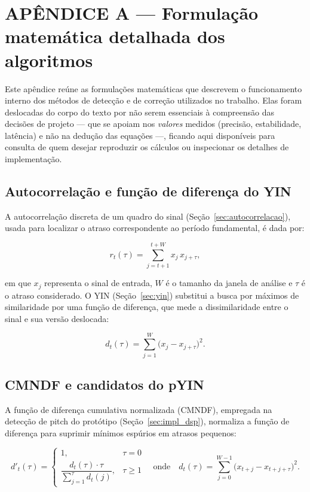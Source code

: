 \chapter{\label{ap:formulas}APÊNDICE A — Formulação matemática detalhada dos algoritmos}

Este apêndice reúne as formulações matemáticas que descrevem o funcionamento
interno dos métodos de detecção e de correção utilizados no trabalho. Elas foram
deslocadas do corpo do texto por não serem essenciais à compreensão das decisões
de projeto --- que se apoiam nos \emph{valores} medidos (precisão, estabilidade,
latência) e não na dedução das equações ---, ficando aqui disponíveis para
consulta de quem desejar reproduzir os cálculos ou inspecionar os detalhes de
implementação.

\section{\label{ap:autocorr_yin}Autocorrelação e função de diferença do YIN}

A autocorrelação discreta de um quadro do sinal (Seção~\ref{sec:autocorrelacao}),
usada para localizar o atraso correspondente ao período fundamental, é dada por:

\begin{equation}
r_t(\tau) = \sum_{j=t+1}^{t+W} x_j\, x_{j+\tau},
\end{equation}

\noindent em que $x_j$ representa o sinal de entrada, $W$ é o tamanho da janela de
análise e $\tau$ é o atraso considerado. O YIN (Seção~\ref{sec:yin}) substitui a
busca por máximos de similaridade por uma função de diferença, que mede a
dissimilaridade entre o sinal e sua versão deslocada:

\begin{equation}
d_t(\tau) = \sum_{j=1}^{W} \bigl(x_j - x_{j+\tau}\bigr)^2 .
\end{equation}

\section{\label{ap:cmndf}CMNDF e candidatos do pYIN}

A função de diferença cumulativa normalizada (CMNDF), empregada na detecção de
pitch do protótipo (Seção~\ref{sec:impl_dsp}), normaliza a função de diferença
para suprimir mínimos espúrios em atrasos pequenos:

\begin{equation}
d'_t(\tau) = \begin{cases}
1, & \tau = 0 \\[4pt]
\dfrac{d_t(\tau) \cdot \tau}{\displaystyle\sum_{j=1}^{\tau} d_t(j)}, & \tau \geq 1
\end{cases}
\quad \text{onde} \quad
d_t(\tau) = \sum_{j=0}^{W-1} \bigl(x_{t+j} - x_{t+j+\tau}\bigr)^2 .
\end{equation}

